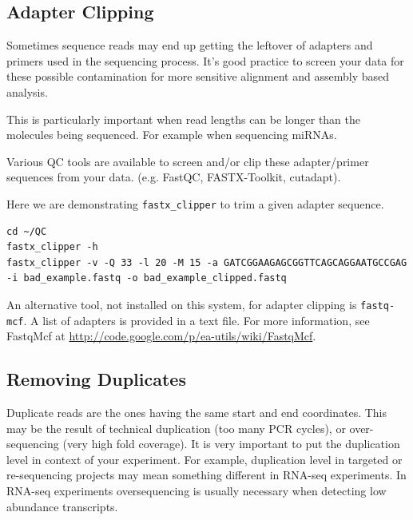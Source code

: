 \begin{advanced}
\subsection{Adapter Clipping}
Sometimes sequence reads may end up getting the leftover of adapters and primers
used in the sequencing process. It's good practice to screen your data for
these possible contamination for more sensitive alignment and assembly based
analysis.

\begin{note}
This is particularly important when read lengths can be longer than the
molecules being sequenced. For example when sequencing miRNAs.
\end{note}

Various QC tools are available to screen and/or clip these adapter/primer
sequences from your data. (e.g. FastQC, FASTX-Toolkit, cutadapt).

\begin{steps}
Here we are demonstrating \texttt{fastx\_clipper} to trim a given adapter
sequence.

\begin{lstlisting}
cd ~/QC
fastx_clipper -h
fastx_clipper -v -Q 33 -l 20 -M 15 -a GATCGGAAGAGCGGTTCAGCAGGAATGCCGAG -i bad_example.fastq -o bad_example_clipped.fastq
\end{lstlisting}
\end{steps}

\begin{note}
An alternative tool, not installed on this system, for adapter clipping is
\texttt{fastq-mcf}. A list of adapters is provided in a text file. For more
information, see FastqMcf at \url{http://code.google.com/p/ea-utils/wiki/FastqMcf}.
\end{note}

\subsection{Removing Duplicates}
Duplicate reads are the ones having the same start and end coordinates. This
may be the result of technical duplication (too many PCR cycles), or
over-sequencing (very high fold coverage). It is very important to put the
duplication level in context of your experiment. For example, duplication level
in targeted or re-sequencing projects may mean something different in RNA-seq
experiments. In RNA-seq experiments oversequencing is usually necessary when
detecting low abundance transcripts.


\end{advanced}
